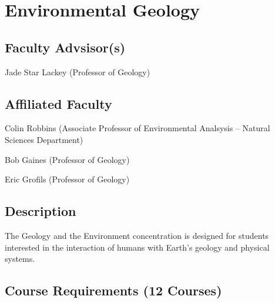 \documentclass{article}\usepackage[]{graphicx}\usepackage[]{xcolor}
\newenvironment{itemize*}%
  {\begin{itemize}%
    \setlength{\itemsep}{0pt}%
    \setlength{\parskip}{0pt}}%
  {\end{itemize}}
\begin{document}
\newpage %
\section{Environmental Geology}



\subsection{Faculty Advsisor(s)}

\begin{itemize*}
  \item Jade Star Lackey (Professor of Geology)
\end{itemize*}

\subsection{Affiliated Faculty}

\begin{itemize*}
  \item Colin Robbins (Associate Professor of Environmental Analsysis -- Natural Sciences Department)
  \item Bob Gaines (Professor of Geology)
  \item Eric Grofils (Professor of Geology)
\end{itemize*}

\subsection{Description}

The Geology and the Environment concentration is designed for students interested in the interaction of humans with Earth’s geology and physical systems.

\subsection{Course Requirements (12 Courses)}
\end{document}
